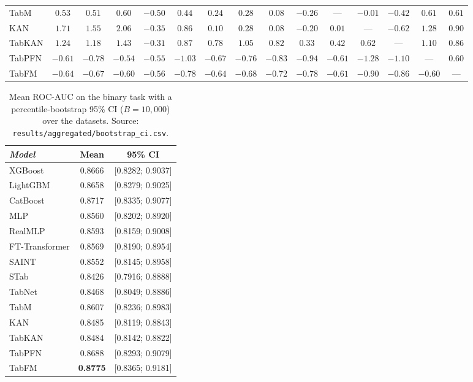 \begin{table}[htbp]
\begin{tabular}{lcccccccccccccc}
TabM & $0.53$ & $0.51$ & $0.60$ & $-0.50$ & $0.44$ & $0.24$ & $0.28$ & $0.08$ & $-0.26$ & --- & $-0.01$ & $-0.42$ & $0.61$ & $0.61$ \\
KAN & $1.71$ & $1.55$ & $2.06$ & $-0.35$ & $0.86$ & $0.10$ & $0.28$ & $0.08$ & $-0.20$ & $0.01$ & --- & $-0.62$ & $1.28$ & $0.90$ \\
TabKAN & $1.24$ & $1.18$ & $1.43$ & $-0.31$ & $0.87$ & $0.78$ & $1.05$ & $0.82$ & $0.33$ & $0.42$ & $0.62$ & --- & $1.10$ & $0.86$ \\
TabPFN & $-0.61$ & $-0.78$ & $-0.54$ & $-0.55$ & $-1.03$ & $-0.67$ & $-0.76$ & $-0.83$ & $-0.94$ & $-0.61$ & $-1.28$ & $-1.10$ & --- & $0.60$ \\
TabFM & $-0.64$ & $-0.67$ & $-0.60$ & $-0.56$ & $-0.78$ & $-0.64$ & $-0.68$ & $-0.72$ & $-0.78$ & $-0.61$ & $-0.90$ & $-0.86$ & $-0.60$ & --- \\
\bottomrule
\end{tabular}
\end{table}

\begin{table}[htbp]
\centering
\small
\caption[Bootstrap CI of the mean AUC --- binary]{Mean ROC-AUC on the binary task with a percentile-bootstrap 95\% CI ($B{=}10{,}000$) over the datasets. Source: \texttt{results/\allowbreak aggregated/\allowbreak bootstrap\_\allowbreak ci.\allowbreak csv}.}
\label{tab:app-bootstrap-auc}
\begin{tabular}{lcc}
\toprule
\emph{Model} & Mean & 95\% CI \\
\midrule
XGBoost & 0.8666 & [0.8282; 0.9037] \\
LightGBM & 0.8658 & [0.8279; 0.9025] \\
CatBoost & 0.8717 & [0.8335; 0.9077] \\
MLP & 0.8560 & [0.8202; 0.8920] \\
RealMLP & 0.8593 & [0.8159; 0.9008] \\
FT-Transformer & 0.8569 & [0.8190; 0.8954] \\
SAINT & 0.8552 & [0.8145; 0.8958] \\
STab & 0.8426 & [0.7916; 0.8888] \\
TabNet & 0.8468 & [0.8049; 0.8886] \\
TabM & 0.8607 & [0.8236; 0.8983] \\
KAN & 0.8485 & [0.8119; 0.8843] \\
TabKAN & 0.8484 & [0.8142; 0.8822] \\
TabPFN & 0.8688 & [0.8293; 0.9079] \\
TabFM & \textbf{0.8775} & [0.8365; 0.9181] \\
\bottomrule
\end{tabular}
\end{table}

